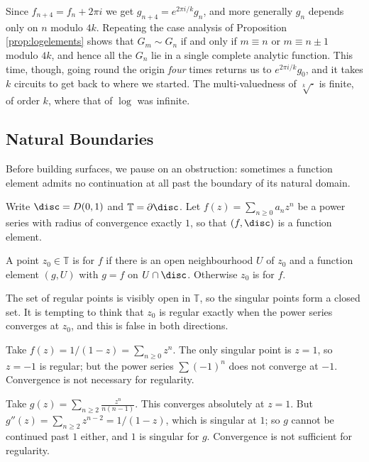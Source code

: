Since $f_{n + 4}= f_n + 2\pi i$ we get $g_{n+4} = e^{2\pi i /k} g_n$, and more generally
$g_n$ depends only on $n$ modulo $4k$. Repeating the case analysis of Proposition
\ref{prop:logelements} shows that $G_m \sim G_n$ if and only if $m \equiv n$ or
$m \equiv n \pm 1$ modulo $4k$, and hence all the $G_n$ lie in a single complete analytic
function. This time, though, going round the origin \emph{four} times returns us to
$e^{2\pi i / k}g_0$, and it takes $k$ circuits to get back to where we started. The
multi-valuedness of $\sqrt[k]{\cdot}$ is finite, of order $k$, where that of $\log$ was
infinite.

\subsection{Natural Boundaries}

Before building surfaces, we pause on an obstruction: sometimes a function element admits
no continuation at all past the boundary of its natural domain.

Write $\disc = D(0,1)$ and $\mathbb{T} = \partial \disc$. Let $f(z) = \sum_{n \geq 0} a_n z^n$
be a power series with radius of convergence exactly $1$, so that $(f, \disc)$ is a
function element.

\begin{definition}
	A point $z_0 \in \mathbb{T}$ is  for $f$ if there is an open
	neighbourhood $U$ of $z_0$ and a function element $(g, U)$ with $g = f$ on
	$U \cap \disc$. Otherwise $z_0$ is  for $f$.
\end{definition}

The set of regular points is visibly open in $\mathbb{T}$, so the singular points form a
closed set. It is tempting to think that $z_0$ is regular exactly when the power series
converges at $z_0$, and this is false in both directions.

\begin{example}
	Take $f(z) = 1/(1-z) = \sum_{n \geq 0} z^n$. The only singular point is $z = 1$, so
	$z = -1$ is regular; but the power series $\sum (-1)^n$ does not converge at $-1$.
	Convergence is not necessary for regularity.
\end{example}

\begin{example}
	Take $g(z) = \sum_{n \geq 2} \frac{z^n}{n(n-1)}$. This converges absolutely at
	$z = 1$. But $g''(z) = \sum_{n\geq 2} z^{n-2} = 1/(1-z)$, which is singular at $1$; so
	$g$ cannot be continued past $1$ either, and $1$ is singular for $g$. Convergence is
	not sufficient for regularity.
\end{example}

